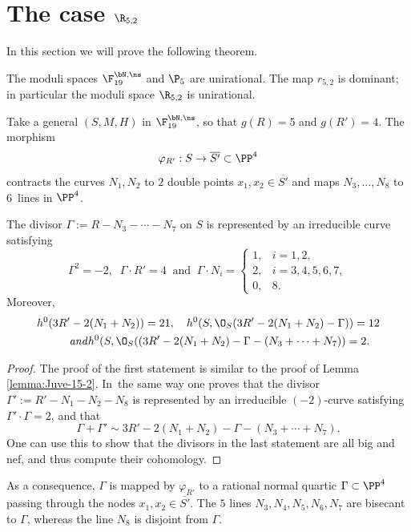 \section{The case \texorpdfstring{$\R_{5,2}$}{R}}

In this section we will prove the following theorem.

\begin{thm}\label{thm:5,2}
The moduli spaces $\F_{19}^{\bN,\ns}$ and $\P_{5}$ are unirational. The map $r_{5,2}$ is dominant; in particular the moduli space $\R_{5,2}$ is unirational.
\end{thm}

Take a general $(S,M,H)$ in $\F_{19}^{\bN,\ns}$, so that $g(R)=5$ and $g(R')=4$. The morphism
\[
\varphi_{R'}:S\to \overline{S'}\subset \PP^4
\]
contracts the curves $N_1,N_2$ to $2$ double points $x_1,x_2 \in \overline{S'}$ and maps $N_3,\ldots,N_8$ to $6$~lines in $\PP^4$.

\begin{lemma} \label{lemma:Juve-15-4}
The divisor
$
\Gamma:=R-N_3-\cdots-N_7
$
on $S$ is represented by an irreducible curve satisfying
\[
 \Gamma^2=-2, \;\; \Gamma\cdot R'=4 \;\; \mbox{and} \;\; \Gamma \cdot N_i =
\begin{cases}
1, & i=1,2, \\
2, & i=3,4,5,6,7,\\
0, & 8.
\end{cases}
\]
Moreover,
\begin{gather*}
h^0(3R'-2(N_1+N_2))=21,\quad h^0(S,\O_S(3R'-2(N_1+N_2)-\Gamma))=12\\
\tag*{\textit{and}}
h^0(S,\O_S((3R'-2(N_1+N_2)-\Gamma-(N_3+\cdots+N_7))=2.
\end{gather*}
\end{lemma}

\begin{proof}
The proof of the first statement is similar to the proof of Lemma \ref{lemma:Juve-15-2}. In~the same way one proves that the divisor
$\Gamma':=R'-N_1-N_2-N_8$ is represented by an irreducible $(-2)$-curve satisfying $\Gamma' \cdot \Gamma=2$, and that
\[
\Gamma+\Gamma' \sim 3R'-2(N_1+N_2)-\Gamma-(N_3+\cdots+N_7).
\]
One can use this to show that the divisors in the last statement are all big and nef, and thus compute their cohomology.
\end{proof}

As a consequence, $\Gamma$ is mapped by $\varphi_{R'}$ to a rational normal quartic $\Gamma\subset \PP^4$ passing through the nodes $x_1,x_2\in \overline{S'}$. The $5$ lines $N_3,N_4,N_5,N_6,N_7$ are bisecant to $\Gamma$, whereas the line $N_8$ is disjoint from $\Gamma$.

